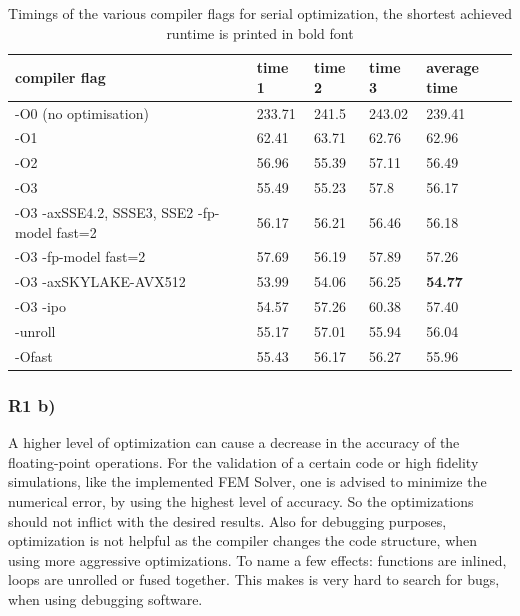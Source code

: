 \documentclass[a4paper, 11pt, oneside]{scrartcl}
\begin{document}
\renewcommand{\arraystretch}{2}
\begin{table}[h!]
	\begin{center}
		\begin{tabular}{| p{5cm} | p{1.5cm} p{1.5cm} p{1.5cm} | p{1.5cm} | }
			\hline
			\hline
			compiler flag & time 1 & time 2 & time 3 & average time\\
			\hline
			-O0 (no optimisation) & 233.71	& 241.5	& 243.02 & 239.41 \\
			\hline
			-O1 & 62.41	& 63.71	& 62.76	& 62.96\\
			\hline
			-O2 & 56.96	& 55.39	& 57.11	& 56.49\\
			\hline 
			-O3 & 55.49	& 55.23	& 57.8	& 56.17\\
			\hline
			-O3 -axSSE4.2, SSSE3, SSE2 -fp-model fast=2 & 56.17	& 56.21	& 56.46	& 56.18\\
			\hline
			-O3 -fp-model fast=2 & 57.69 & 56.19 & 57.89 & 57.26\\
			\hline
			-O3 -axSKYLAKE-AVX512 & 53.99 & 54.06 & 56.25 & \textbf{54.77}\\
			\hline
			-O3 -ipo & 54.57 & 57.26 & 60.38 & 57.40\\
			\hline
			-unroll & 55.17	& 57.01	& 55.94	& 56.04\\
			\hline
			-Ofast & 55.43	& 56.17	& 56.27	& 55.96\\
			\hline
			\hline
		\end{tabular}
		\caption{\label{tab:SerialTimings}  Timings of the various compiler flags for serial optimization, the shortest achieved runtime is printed in bold font}
	\end{center}
\end{table}
\renewcommand{\arraystretch}{1}

\subsubsection{R1 b)}
A higher level of optimization can cause a decrease in the accuracy of the floating-point operations. For the validation of a certain code or high fidelity simulations, like the implemented FEM Solver, one is advised to minimize the numerical error, by using the highest level of accuracy. So the optimizations should not inflict with the desired results. Also for debugging purposes, optimization is not helpful as the compiler changes the code structure, when using more aggressive optimizations. To name a few effects: functions are inlined, loops are unrolled or fused together. This makes is very hard to search for bugs, when using debugging software.
\end{document}
